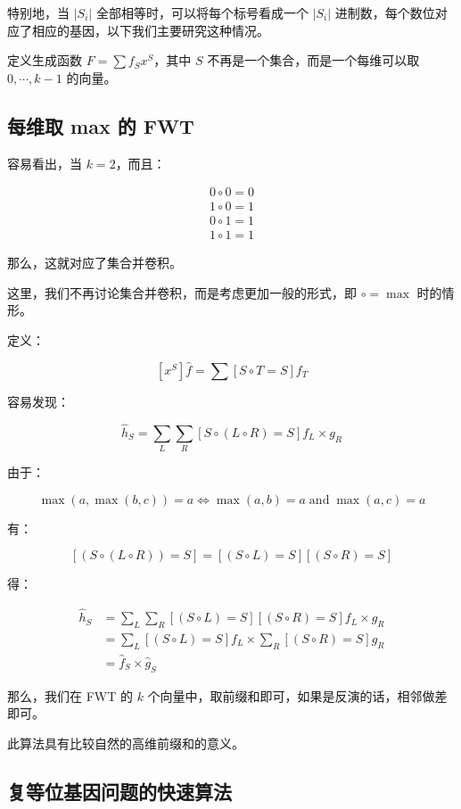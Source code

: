 \documentclass[12pt]{article} %
\begin{document}
特别地，当 $|S_i|$ 全部相等时，可以将每个标号看成一个 $|S_i|$ 进制数，每个数位对应了相应的基因，以下我们主要研究这种情况。

定义生成函数 $F=\sum f_S x^S$，其中 $S$ 不再是一个集合，而是一个每维可以取 $0,\cdots ,k-1$ 的向量。

\subsection{每维取 max 的 FWT}

容易看出，当 $k=2$，而且：

$$\begin{aligned}0 \circ 0 = 0 \\ 1 \circ 0 = 1 \\ 0 \circ 1 = 1 \\ 1 \circ 1 = 1\end{aligned}$$

那么，这就对应了集合并卷积。

这里，我们不再讨论集合并卷积，而是考虑更加一般的形式，即 $\circ = \max$ 时的情形。

定义：

$$[x^S]\hat f=\sum[S \circ T=S] f_T$$

容易发现：

$$\hat h_S=\sum_{L}\sum_{R}[S \circ (L \circ R) = S] f_L \times g_R$$

由于：

$$\max(a,\max(b,c))=a \Leftrightarrow \max(a,b)=a \operatorname{and} \max(a,c)=a$$

有：

$$[(S \circ (L \circ R))=S]=[(S \circ L) =S][(S \circ R)=S]$$

得：

$$\begin{aligned} \hat h_S &= \sum_{L} \sum_{R} [(S \circ L) =S][(S \circ R)=S] f_L \times g_R \\ &= \sum_{L} [(S \circ L)=S] f_L \times \sum_{R} [(S \circ R)=S] g_R \\ &= \hat f_S \times \hat g_S\end{aligned}$$


那么，我们在 FWT 的 $k$ 个向量中，取前缀和即可，如果是反演的话，相邻做差即可。

此算法具有比较自然的高维前缀和的意义。

\subsection{复等位基因问题的快速算法}
\end{document}
